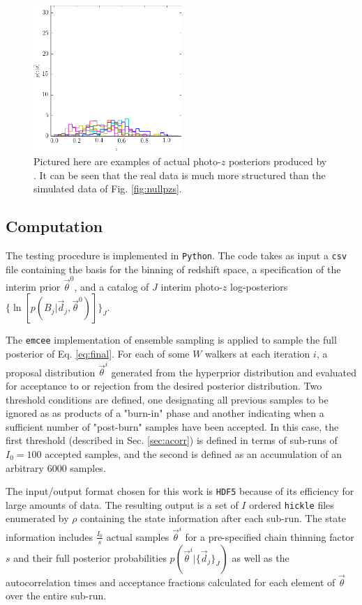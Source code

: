 \documentclass[preprint]{aastex}
\begin{document}
\begin{figure}
\includegraphics[width=0.5\textwidth]{figs/boss/samplepzs.png}
\caption{Pictured here are examples of actual photo-$z$ posteriors produced by 
\citet{Sheldon2012}.  It can be seen that the real data is much more structured 
than the simulated data of Fig. \ref{fig:nullpzs}.}
\label{fig:datapzs}
\end{figure}

\clearpage
\subsection{Computation}
\label{sec:mcmc}

The testing procedure is implemented in \texttt{Python}.  The code takes as 
input a \texttt{csv} file containing the basis for the binning of redshift 
space, a specification of the interim prior $\vec{\theta}^{0}$, and a catalog 
of $J$ interim photo-$z$ log-posteriors 
$\{\ln[p(B_{j}|\vec{d}_{j},\vec{\theta}^{0})]\}_{J}$.

The \texttt{emcee} \citep{Foreman-Mackey2013} implementation of ensemble 
sampling is applied to sample the full posterior of Eq. \ref{eq:final}.   For 
each of some $W$ walkers at each iteration $i$, a proposal distribution 
$\vec{\theta}^{i}$ generated from the hyperprior distribution and evaluated for 
acceptance to or rejection from the desired posterior distribution.  Two 
threshold conditions are defined, one designating all previous samples to be 
ignored as as products of a "burn-in" phase and another indicating when a 
sufficient number of "post-burn" samples have been accepted.  In this case, the 
first threshold (described in Sec. \ref{sec:acorr}) is defined in terms of 
sub-runs of $I_{0}=100$ accepted samples, and the second is defined as an 
accumulation of an arbitrary 6000 samples.

The input/output format chosen for this work is \texttt{HDF5} because of its 
efficiency for large amounts of data.  The resulting output is a set of $I$ 
ordered \texttt{hickle} files enumerated by $\rho$ containing the state 
information after each sub-run.  The state information includes 
$\frac{I_{0}}{s}$ actual samples $\vec{\theta}^{i}$ for a pre-specified chain 
thinning factor $s$ and their full posterior probabilities 
$p(\vec{\theta}^{i}|\{\vec{d}_{j}\}_{J})$ as well as the autocorrelation times 
and acceptance fractions calculated for each element of $\vec{\theta}$ over the 
entire sub-run.  
\end{document}
